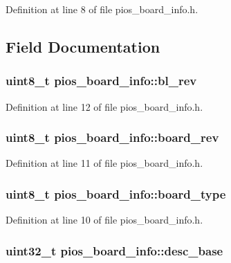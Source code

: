 \-Definition at line 8 of file pios\-\_\-board\-\_\-info.\-h.



\subsection{\-Field \-Documentation}
\hypertarget{structpios__board__info_ab862f6bf9209684556e24b7e7cd014f7}{
\subsubsection[{bl\-\_\-rev}]{\setlength{\rightskip}{0pt plus 5cm}uint8\-\_\-t {\bf pios\-\_\-board\-\_\-info\-::bl\-\_\-rev}}}\label{structpios__board__info_ab862f6bf9209684556e24b7e7cd014f7}


\-Definition at line 12 of file pios\-\_\-board\-\_\-info.\-h.

\hypertarget{structpios__board__info_a7c5ba691095b534927e3f0b6cc7202d6}{
\subsubsection[{board\-\_\-rev}]{\setlength{\rightskip}{0pt plus 5cm}uint8\-\_\-t {\bf pios\-\_\-board\-\_\-info\-::board\-\_\-rev}}}\label{structpios__board__info_a7c5ba691095b534927e3f0b6cc7202d6}


\-Definition at line 11 of file pios\-\_\-board\-\_\-info.\-h.

\hypertarget{structpios__board__info_a5aff4607db694a6885c0ce5361afa9bb}{
\subsubsection[{board\-\_\-type}]{\setlength{\rightskip}{0pt plus 5cm}uint8\-\_\-t {\bf pios\-\_\-board\-\_\-info\-::board\-\_\-type}}}\label{structpios__board__info_a5aff4607db694a6885c0ce5361afa9bb}


\-Definition at line 10 of file pios\-\_\-board\-\_\-info.\-h.

\hypertarget{structpios__board__info_abf65ae5cf522219445a2fc436a771365}{
\subsubsection[{desc\-\_\-base}]{\setlength{\rightskip}{0pt plus 5cm}uint32\-\_\-t {\bf pios\-\_\-board\-\_\-info\-::desc\-\_\-base}}}\label{structpios__board__info_abf65ae5cf522219445a2fc436a771365}



